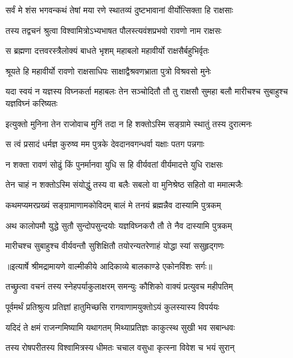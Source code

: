 \twolineshloka
{सर्वं मे शंस भगवन्कथं तेषां मया रणे}
{स्थातव्यं दुष्टभावानां वीर्योत्सिक्ता हि राक्षसाः} %

\twolineshloka
{तस्य तद्वचनं श्रुत्वा विश्वामित्रोऽभ्यभाषत}
{पौलस्त्यवंशप्रभवो रावणो नाम राक्षसः} %

\twolineshloka
{स ब्रह्मणा दत्तवरस्त्रैलोक्यं बाधते भृशम्}
{महाबलो महावीर्यो राक्षसैर्बहुभिर्वृतः} %

\twolineshloka
{श्रूयते हि महावीर्यो रावणो राक्षसाधिपः}
{साक्षाद्वैश्रवणभ्राता पुत्रो विश्रवसो मुनेः} %

\threelineshloka
{यदा स्वयं न यज्ञस्य विघ्नकर्ता महाबलः}
{तेन सञ्चोदितौ तौ तु राक्षसौ सुमहा बलौ}
{मारीचश्च सुबाहुश्च यज्ञविघ्नं करिष्यतः} %

\twolineshloka
{इत्युक्तो मुनिना तेन राजोवाच मुनिं तदा}
{न हि शक्तोऽस्मि सङ्ग्रामे स्थातुं तस्य दुरात्मनः} %

\twolineshloka
{स त्वं प्रसादं धर्मज्ञ कुरुष्व मम पुत्रके}
{देवदानवगन्धर्वा यक्षाः पतग पन्नगाः} %

\twolineshloka
{न शक्ता रावणं सोढुं किं पुनर्मानवा युधि}
{स हि वीर्यवतां वीर्यमादत्ते युधि राक्षसः} %

\twolineshloka
{तेन चाहं न शक्तोऽस्मि संयोद्धुं तस्य वा बलैः}
{सबलो वा मुनिश्रेष्ठ सहितो वा ममात्मजैः} %

\twolineshloka
{कथमप्यमरप्रख्यं सङ्ग्रामाणामकोविदम्}
{बालं मे तनयं ब्रह्मन्नैव दास्यामि पुत्रकम्} %

\twolineshloka
{अथ कालोपमौ युद्धे सुतौ सुन्दोपसुन्दयोः}
{यज्ञविघ्नकरौ तौ ते नैव दास्यामि पुत्रकम्} %

\twolineshloka
{मारीचश्च सुबाहुश्च वीर्यवन्तौ सुशिक्षितौ}
{तयोरन्यतरेणाहं योद्धा स्यां ससुहृद्गणः} %


{॥इत्यार्षे श्रीमद्रामायणे वाल्मीकीये आदिकाव्ये बालकाण्डे एकोनविंशः सर्गः॥}


\twolineshloka
{तच्छ्रुत्वा वचनं तस्य स्नेहपर्याकुलाक्षरम्}
{समन्युः कौशिको वाक्यं प्रत्युवच महीपतिम्} %

\twolineshloka
{पूर्वमर्थं प्रतिश्रुत्य प्रतिज्ञां हातुमिच्छसि}
{रागवाणामयुक्तोऽयं कुलस्यास्य विपर्ययः} %

\twolineshloka
{यदिदं ते क्षमं राजन्गमिष्यामि यथागतम्}
{मिथ्याप्रतिज्ञः काकुत्स्थ सुखी भव सबान्धवः} %

\twolineshloka
{तस्य रोषपरीतस्य विश्वामित्रस्य धीमतः}
{चचाल वसुधा कृत्स्ना विवेश च भयं सुरान्} %

